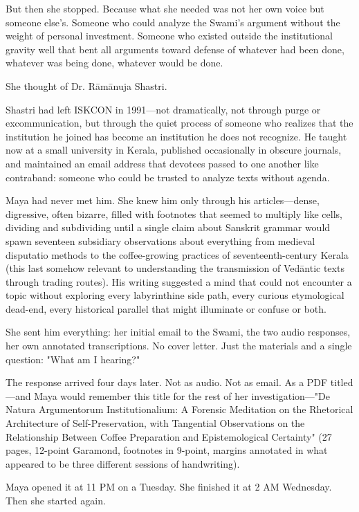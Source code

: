 \documentclass[12pt,twoside]{book}
\begin{document}
But then she stopped. Because what she needed was not her own voice but someone else's. Someone who could analyze the Swami's argument without the weight of personal investment. Someone who existed outside the institutional gravity well that bent all arguments toward defense of whatever had been done, whatever was being done, whatever would be done.

She thought of Dr. Rāmānuja Shastri.

Shastri had left ISKCON in 1991—not dramatically, not through purge or excommunication, but through the quiet process of someone who realizes that the institution he joined has become an institution he does not recognize. He taught now at a small university in Kerala, published occasionally in obscure journals, and maintained an email address that devotees passed to one another like contraband: someone who could be trusted to analyze texts without agenda.

Maya had never met him. She knew him only through his articles—dense, digressive, often bizarre, filled with footnotes that seemed to multiply like cells, dividing and subdividing until a single claim about Sanskrit grammar would spawn seventeen subsidiary observations about everything from medieval disputatio methods to the coffee-growing practices of seventeenth-century Kerala (this last somehow relevant to understanding the transmission of Vedāntic texts through trading routes). His writing suggested a mind that could not encounter a topic without exploring every labyrinthine side path, every curious etymological dead-end, every historical parallel that might illuminate or confuse or both.

She sent him everything: her initial email to the Swami, the two audio responses, her own annotated transcriptions. No cover letter. Just the materials and a single question: "What am I hearing?"

The response arrived four days later. Not as audio. Not as email. As a PDF titled—and Maya would remember this title for the rest of her investigation—"De Natura Argumentorum Institutionalium: A Forensic Meditation on the Rhetorical Architecture of Self-Preservation, with Tangential Observations on the Relationship Between Coffee Preparation and Epistemological Certainty" (27 pages, 12-point Garamond, footnotes in 9-point, margins annotated in what appeared to be three different sessions of handwriting).

Maya opened it at 11 PM on a Tuesday. She finished it at 2 AM Wednesday. Then she started again.
\end{document}
